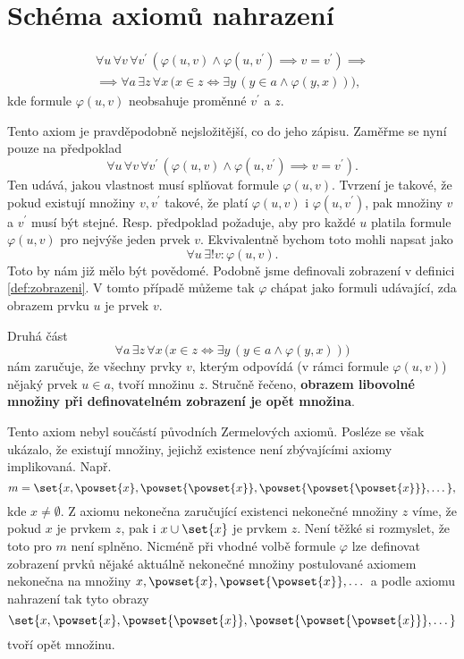 \section{Schéma axiomů nahrazení}\label{sec:schema_axiomu_nahrazeni}
\begin{align*}
    \forall u\,\forall v\,\forall v^\prime\,(\varphi(u,v) \land \varphi(u,v^\prime) \implies v=v^\prime)\implies\\ \implies \forall a\,\exists z\,\forall x\,\bigl(x\in z \iff \exists y\,(y\in a \land \varphi(y,x))\bigr),
\end{align*}
kde formule $\varphi(u,v)$ neobsahuje proměnné $v^\prime$ a $z$.\par
Tento axiom je pravděpodobně nejsložitější, co do jeho zápisu. Zaměřme se nyní pouze na předpoklad
\begin{equation*}
    \forall u\,\forall v\,\forall v^\prime\,(\varphi(u,v) \land \varphi(u,v^\prime) \implies v=v^\prime).
\end{equation*}
Ten udává, jakou vlastnost musí splňovat formule $\varphi(u,v)$. Tvrzení je takové, že pokud existují množiny $v,v^\prime$ takové, že platí $\varphi(u,v)$ i $\varphi(u,v^\prime)$, pak množiny $v$ a $v^\prime$ musí být stejné. Resp. předpoklad požaduje, aby pro každé $u$ platila formule $\varphi(u,v)$ pro nejvýše jeden prvek $v$. Ekvivalentně bychom toto mohli napsat jako
\begin{equation*}
    \forall u\,\exists! v: \varphi(u,v).
\end{equation*}
Toto by nám již mělo být povědomé. Podobně jsme definovali zobrazení v definici \ref{def:zobrazeni}. V tomto případě můžeme tak $\varphi$ chápat jako formuli udávající, zda obrazem prvku $u$ je prvek $v$.\par
Druhá část
\begin{equation*}
    \forall a\,\exists z\,\forall x\,\bigl(x\in z \iff \exists y\,(y\in a \land \varphi(y,x))\bigr)
\end{equation*}
nám zaručuje, že všechny prvky $v$, kterým odpovídá (v rámci formule $\varphi(u,v)$) nějaký prvek $u\in a$, tvoří množinu $z$. Stručně řečeno, \textbf{obrazem libovolné množiny při definovatelném zobrazení je opět množina}.\par
Tento axiom nebyl součástí původních Zermelových axiomů. Posléze se však ukázalo, že existují množiny, jejichž existence není zbývajícími axiomy implikovaná. Např.
\begin{equation*}
    m=\set{x,\powset{x},\powset{\powset{x}},\powset{\powset{\powset{x}}},\dots},
\end{equation*}
kde $x\neq\emptyset$. Z axiomu nekonečna zaručující existenci nekonečné množiny $z$ víme, že pokud $x$ je prvkem $z$, pak i $x\cup\set{x}$ je prvkem $z$. Není těžké si rozmyslet, že toto pro $m$ není splněno. Nicméně při vhodné volbě formule $\varphi$ lze definovat zobrazení prvků nějaké aktuálně nekonečné množiny postulované axiomem nekonečna na množiny $x,\powset{x},\powset{\powset{x}},\dots$ a podle axiomu nahrazení tak tyto obrazy
\begin{equation*}
    \set{x,\powset{x},\powset{\powset{x}},\powset{\powset{\powset{x}}},\dots}
\end{equation*}
tvoří opět množinu.

